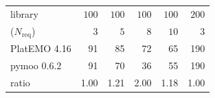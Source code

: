 \footnotesize
\setlength{\tabcolsep}{7pt}
\begin{tabular}{lrrrrr}
\toprule
library & $100$ & $100$ & $100$ & $100$ & $200$ \\
($N_{\mathrm{req}}$) & $3$ & $5$ & $8$ & $10$ & $3$ \\
\midrule
PlatEMO 4.16 & 91 & 85 & 72 & 65 & 190 \\
pymoo 0.6.2 & 91 & 70 & 36 & 55 & 190 \\
\addlinespace
ratio & 1.00 & 1.21 & 2.00 & 1.18 & 1.00 \\
\bottomrule
\end{tabular}
